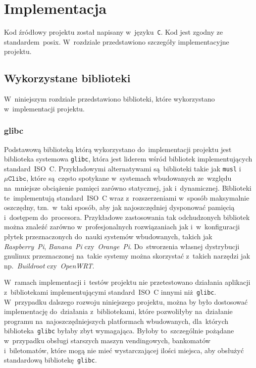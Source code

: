 \documentclass[thesis]{subfiles}
\begin{document}
\chapter{Implementacja}
\label{chapter:implementacja}

Kod źródłowy projektu został napisany w~języku~\texttt{C}. Kod jest zgodny ze standardem~\gls{posix}. W~rozdziale przedstawiono szczegóły implementacyjne projektu.


\section{Wykorzystane biblioteki}

W~niniejszym rozdziale przedstawiono biblioteki, które wykorzystano w~implementacji projektu.


\subsection{glibc}

Podstawową biblioteką którą wykorzystano do~implementacji projektu jest biblioteka systemowa \texttt{glibc}, która jest liderem wśród bibliotek implementujących standard~ISO~C. Przykładowymi alternatywami są~biblioteki takie jak \texttt{musl} i~$\mu\texttt{Clibc}$, które są~często spotykane w~systemach wbudowanych ze~względu na~mniejsze obciążenie pamięci zarówno statycznej, jak i~dynamicznej. Biblioteki te~implementują standard~ISO~C wraz z~rozszerzeniami w~sposób maksymalnie oszczędny, tzn.~w~taki sposób, aby jak najoszczędniej dysponować pamięcią i~dostępem do~procesora. Przykładowe zastosowania tak odchudzonych bibliotek można znaleźć zarówno w~profesjonalnych rozwiązaniach jak i~w~konfiguracji płytek przeznaczonych do~nauki systemów wbudowanych, takich jak \emph{Raspberry~Pi}, \emph{Banana~Pi} czy~\emph{Orange~Pi}. Do~stworzenia własnej dystrybucji \gls{gnulinux} przeznaczonej na~takie systemy można skorzystać z~takich narzędzi jak np.~\emph{Buildroot} czy~\emph{OpenWRT}.

W~ramach implementacji i~testów projektu nie przetestowano działania aplikacji z~bibliotekami implementującymi standard~ISO~C innymi niż~\texttt{glibc}. W~przypadku dalszego rozwoju niniejszego projektu, można by było dostosować implementację do~działania z~bibliotekami, które pozwoliłyby na~działanie programu na~najoszczędniejszych platformach wbudowanych, dla~których biblioteka~\texttt{glibc} byłaby zbyt wymagająca. Byłoby to~szczególnie pożądane w~przypadku obsługi starszych maszyn vendingowych, bankomatów i~biletomatów, które mogą nie mieć wystarczającej ilości miejsca, aby obsłużyć standardową bibliotekę~\texttt{glibc}.
\end{document}
